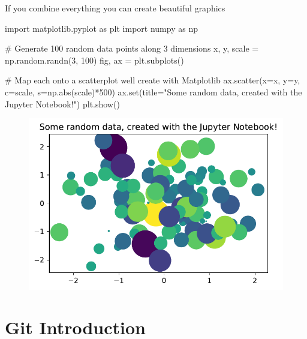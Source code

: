 \documentclass[
  letterpaper,
  DIV=11,
  numbers=noendperiod]{scrreprt}
\newenvironment{Shaded}{\begin{snugshade}}{\end{snugshade}}
\newcommand{\BuiltInTok}[1]{\textcolor[rgb]{0.00,0.23,0.31}{#1}}
\newcommand{\CommentTok}[1]{\textcolor[rgb]{0.37,0.37,0.37}{#1}}
\newcommand{\DecValTok}[1]{\textcolor[rgb]{0.68,0.00,0.00}{#1}}
\newcommand{\ImportTok}[1]{\textcolor[rgb]{0.00,0.46,0.62}{#1}}
\newcommand{\NormalTok}[1]{\textcolor[rgb]{0.00,0.23,0.31}{#1}}
\newcommand{\OperatorTok}[1]{\textcolor[rgb]{0.37,0.37,0.37}{#1}}
\newcommand{\StringTok}[1]{\textcolor[rgb]{0.13,0.47,0.30}{#1}}
\begin{document}
If you combine everything you can create beautiful graphics

\begin{Shaded}
\begin{Highlighting}[]
\ImportTok{import}\NormalTok{ matplotlib.pyplot }\ImportTok{as}\NormalTok{ plt}
\ImportTok{import}\NormalTok{ numpy }\ImportTok{as}\NormalTok{ np}

\CommentTok{\# Generate 100 random data points along 3 dimensions}
\NormalTok{x, y, scale }\OperatorTok{=}\NormalTok{ np.random.randn(}\DecValTok{3}\NormalTok{, }\DecValTok{100}\NormalTok{)}
\NormalTok{fig, ax }\OperatorTok{=}\NormalTok{ plt.subplots()}

\CommentTok{\# Map each onto a scatterplot we\textquotesingle{}ll create with Matplotlib}
\NormalTok{ax.scatter(x}\OperatorTok{=}\NormalTok{x, y}\OperatorTok{=}\NormalTok{y, c}\OperatorTok{=}\NormalTok{scale, s}\OperatorTok{=}\NormalTok{np.}\BuiltInTok{abs}\NormalTok{(scale)}\OperatorTok{*}\DecValTok{500}\NormalTok{)}
\NormalTok{ax.}\BuiltInTok{set}\NormalTok{(title}\OperatorTok{=}\StringTok{"Some random data, created with the Jupyter Notebook!"}\NormalTok{)}
\NormalTok{plt.show()}
\end{Highlighting}
\end{Shaded}

\begin{figure}[H]

{\centering \includegraphics{a_01_intro_to_notebooks_files/figure-pdf/cell-3-output-1.pdf}

}

\end{figure}

\hypertarget{git-introduction}{%
\chapter{Git Introduction}\label{git-introduction}}
\end{document}
